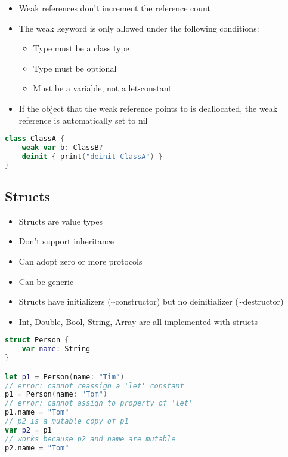 \begin{breakbox}

\begin{itemize}
\tightlist
\item
  Weak references don't increment the reference count
\item
  The weak keyword is only allowed under the following conditions:

  \begin{itemize}
  \tightlist
  \item
    Type must be a class type
  \item
    Type must be optional
  \item
    Must be a variable, not a let-constant
  \end{itemize}
\item
  If the object that the weak reference points to is deallocated, the
  weak reference is automatically set to nil
\end{itemize}

\begin{lstlisting}[language=swift]
class ClassA {
    weak var b: ClassB?
    deinit { print("deinit ClassA") }
}
\end{lstlisting}
\end{breakbox}

\subsection{Structs}

\begin{breakbox}

\begin{itemize}
\tightlist
\item
  Structs are value types
\item
  Don't support inheritance
\item
  Can adopt zero or more protocols
\item
  Can be generic
\item
  Structs have initializers (\textasciitilde{}constructor) but no
  deinitializer (\textasciitilde{}destructor)
\item
  Int, Double, Bool, String, Array are all implemented with structs
\end{itemize}

\begin{lstlisting}[language=swift]
struct Person {
    var name: String
}

let p1 = Person(name: "Tim")
// error: cannot reassign a 'let' constant
p1 = Person(name: "Tom")
// error: cannot assign to property of 'let'
p1.name = "Tom"
// p2 is a mutable copy of p1
var p2 = p1   
// works because p2 and name are mutable
p2.name = "Tom"   
\end{lstlisting}
\end{breakbox}

